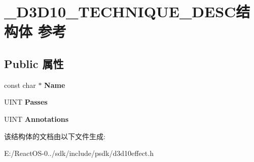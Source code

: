 \hypertarget{struct___d3_d10___t_e_c_h_n_i_q_u_e___d_e_s_c}{}\section{\+\_\+\+D3\+D10\+\_\+\+T\+E\+C\+H\+N\+I\+Q\+U\+E\+\_\+\+D\+E\+S\+C结构体 参考}
\label{struct___d3_d10___t_e_c_h_n_i_q_u_e___d_e_s_c}
\subsection*{Public 属性}
\begin{DoxyCompactItemize}
\item 
\mbox{\label{struct___d3_d10___t_e_c_h_n_i_q_u_e___d_e_s_c_aa364fbb58c8fddc31bc8c0ea16defe7d}} 
const char $\ast$ {\bfseries Name}
\item 
\mbox{\label{struct___d3_d10___t_e_c_h_n_i_q_u_e___d_e_s_c_a7eea6c1ee9b64b9c77a0ddbdfe149468}} 
U\+I\+NT {\bfseries Passes}
\item 
\mbox{\label{struct___d3_d10___t_e_c_h_n_i_q_u_e___d_e_s_c_a278b6de5dbef5f5c5411ac5c0769a838}} 
U\+I\+NT {\bfseries Annotations}
\end{DoxyCompactItemize}


该结构体的文档由以下文件生成\+:\begin{DoxyCompactItemize}
\item 
E\+:/\+React\+O\+S-\/0../sdk/include/psdk/d3d10effect.\+h\end{DoxyCompactItemize}
